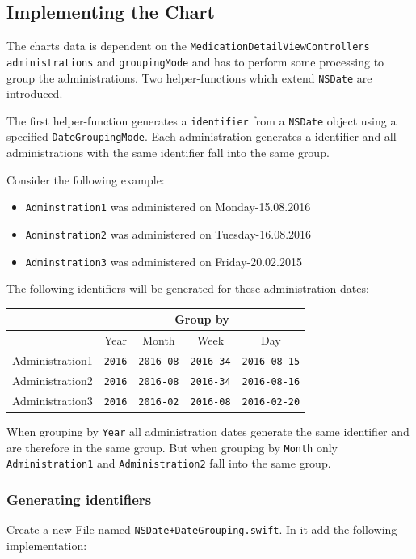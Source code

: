 \documentclass{article}
\begin{document}
\subsection{Implementing the Chart}\label{implementing-the-chart}

The charts data is dependent on the
\texttt{MedicationDetailViewControllers} \texttt{administrations} and
\texttt{groupingMode} and has to perform some processing to group the
administrations. Two helper-functions which extend \texttt{NSDate} are
introduced.

The first helper-function generates a \texttt{identifier} from a
\texttt{NSDate} object using a specified \texttt{DateGroupingMode}. Each
administration generates a identifier and all administrations with the
same identifier fall into the same group.

Consider the following example:
\begin{itemize}
  \item
    \texttt{Adminstration1} was administered on Monday-15.08.2016
  \item
    \texttt{Adminstration2} was administered on Tuesday-16.08.2016
  \item
    \texttt{Adminstration3} was administered on Friday-20.02.2015
\end{itemize}

The following identifiers will be generated for these
administration-dates:

\begin{tabular}[H]{ |c|c|c|c|c| }
  \hline
  & \multicolumn{4}{|c|}{Group by} \\
  \hline
& Year & Month & Week & Day \\
  \hline
  Administration1 & \texttt{2016} & \texttt{2016-08} & \texttt{2016-34} &
  \texttt{2016-08-15}\\
  Administration2 & \texttt{2016} & \texttt{2016-08} & \texttt{2016-34} &
  \texttt{2016-08-16}\\
  Administration3 & \texttt{2016} & \texttt{2016-02} & \texttt{2016-08} &
  \texttt{2016-02-20}\\
  \hline
\end{tabular}
When grouping by \texttt{Year} all administration dates generate the
same identifier and are therefore in the same group. But when grouping
by \texttt{Month} only \texttt{Administration1} and
\texttt{Administration2} fall into the same group.

\subsubsection{Generating identifiers}\label{generating-identifiers}
Create a new File named \texttt{NSDate+DateGrouping.swift}.
In it add the following implementation:
\end{document}
